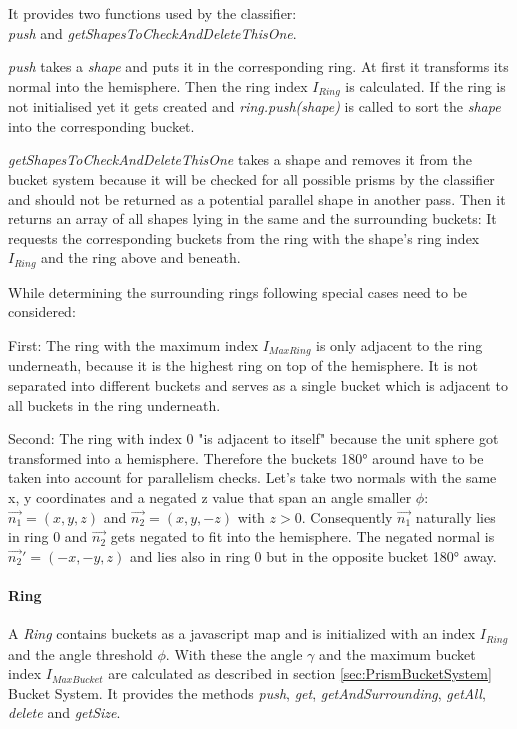 \documentclass[../ClassicThesis.tex]{subfiles}
\begin{document}
It provides two functions used by the classifier: \\
\emph{push} and \emph{getShapesToCheckAndDeleteThisOne}.

\emph{push} takes a \emph{shape} and puts it in the corresponding ring. At first it transforms its normal into the hemisphere. Then the ring index $ I_{Ring} $ is calculated. If the ring is not initialised yet it gets created and \emph{ring.push(shape)} is called to sort the \emph{shape} into the corresponding bucket.

\emph{getShapesToCheckAndDeleteThisOne} takes a shape and removes it from the bucket system because it will be checked for all possible prisms by the classifier and should not be returned as a potential parallel shape in another pass. Then it returns an array of all shapes lying in the same and the surrounding buckets: It requests the corresponding buckets from the ring with the shape's ring index $ I_{Ring} $ and the ring above and beneath.

While determining the surrounding rings following special cases need to be considered:

First: The ring with the maximum index $I_{MaxRing}$ is only adjacent to the ring underneath, because it is the highest ring on top of the hemisphere. It is not separated into different buckets and serves as a single bucket which is adjacent to all buckets in the ring underneath.

Second: The ring with index 0 "is adjacent to itself" because the unit sphere got transformed into a hemisphere. Therefore the buckets 180° around have to be taken into account for parallelism checks. Let's take two normals with the same x, y coordinates and a negated z value that span an angle smaller $ \phi $: $\vec{n_{1}} = (x, y, z)$ and $\vec{n_{2}} = (x, y, -z)$ with $z > 0$. Consequently $\vec{n_{1}}$ naturally lies in ring 0 and $\vec{n_{2}}$ gets negated to fit into the hemisphere. The negated normal is $\vec{n_{2}}' = (-x, -y, z) $ and lies also in ring 0 but in the opposite bucket 180° away.


\paragraph{Ring}

A \emph{Ring} contains buckets as a javascript map and is initialized with an index $ I_{Ring} $ and the angle threshold $ \phi$. With these the angle $ \gamma $ and the maximum bucket index $ I_{MaxBucket} $ are calculated as described in section \ref{sec:PrismBucketSystem} Bucket System. It provides the methods \emph{push}, \emph{get}, \emph{getAndSurrounding}, \emph{getAll}, \emph{delete} and \emph{getSize}.
\end{document}

